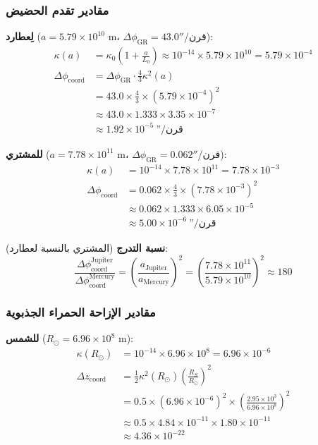 \documentclass[11pt,a4paper]{article}
\begin{document}
	\subsubsection{مقادير تقدم الحضيض}
	
	\textbf{لِعطارد} ($a = 5.79 \times 10^{10}$ m، $\Delta\phi_{\text{GR}} = 43.0''$/قرن):
	\begin{align}
		\kappa(a) &= \kappa_0 \left(1 + \frac{a}{L_0}\right) 
		\approx 10^{-14} \times 5.79 \times 10^{10} = 5.79 \times 10^{-4} \\
		\Delta\phi_{\text{coord}} &= \Delta\phi_{\text{GR}} \cdot \frac{4}{3} \kappa^2(a) \\
		&= 43.0 \times \frac{4}{3} \times (5.79 \times 10^{-4})^2 \\
		&\approx 43.0 \times 1.333 \times 3.35 \times 10^{-7} \\
		&\approx 1.92 \times 10^{-5} \ \text{''}/\text{قرن}
	\end{align}
	
	\textbf{للمشتري} ($a = 7.78 \times 10^{11}$ m، $\Delta\phi_{\text{GR}} = 0.062''$/قرن):
	\begin{align}
		\kappa(a) &= 10^{-14} \times 7.78 \times 10^{11} = 7.78 \times 10^{-3} \\
		\Delta\phi_{\text{coord}} &= 0.062 \times \frac{4}{3} \times (7.78 \times 10^{-3})^2 \\
		&\approx 0.062 \times 1.333 \times 6.05 \times 10^{-5} \\
		&\approx 5.00 \times 10^{-6}~\text{''}/\text{قرن}
	\end{align}
	
	\textbf{نسبة التدرج} (المشتري بالنسبة لعطارد):
	\begin{equation}
		\frac{\Delta\phi_{\text{coord}}^{\text{Jupiter}}}{\Delta\phi_{\text{coord}}^{\text{Mercury}}}
		= \left(\frac{a_{\text{Jupiter}}}{a_{\text{Mercury}}}\right)^2 
		= \left(\frac{7.78 \times 10^{11}}{5.79 \times 10^{10}}\right)^2 \approx 180
	\end{equation}
	
	\subsubsection{مقادير الإزاحة الحمراء الجذبوية}
	
	\textbf{للشمس} ($R_\odot = 6.96 \times 10^8$ m):
	\begin{align}
		\kappa(R_\odot) &= 10^{-14} \times 6.96 \times 10^8 = 6.96 \times 10^{-6} \\
		\Delta z_{\text{coord}} &= \frac{1}{2} \kappa^2(R_\odot) \left(\frac{R_S}{R_\odot}\right)^2 \\
		&= 0.5 \times (6.96 \times 10^{-6})^2 \times \left(\frac{2.95 \times 10^3}{6.96 \times 10^8}\right)^2 \\
		&\approx 0.5 \times 4.84 \times 10^{-11} \times 1.80 \times 10^{-11} \\
		&\approx 4.36 \times 10^{-22}
	\end{align}
	
\end{document}
